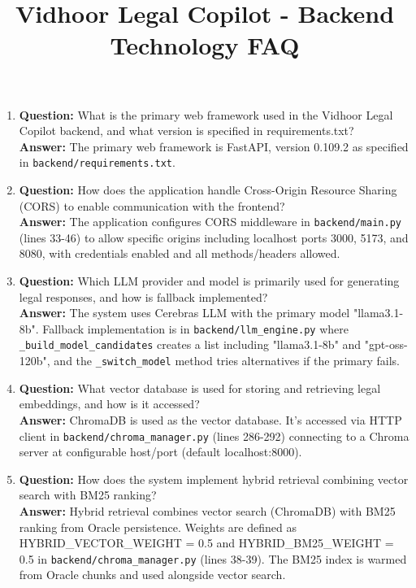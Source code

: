 \documentclass[11pt]{article}
\title{Vidhoor Legal Copilot - Backend Technology FAQ}
\author{}
\date{}
\begin{document}
\maketitle

\begin{enumerate}
\item \textbf{Question:} What is the primary web framework used in the Vidhoor Legal Copilot backend, and what version is specified in requirements.txt?
\\ \textbf{Answer:} The primary web framework is FastAPI, version 0.109.2 as specified in \texttt{backend/requirements.txt}.

\item \textbf{Question:} How does the application handle Cross-Origin Resource Sharing (CORS) to enable communication with the frontend?
\\ \textbf{Answer:} The application configures CORS middleware in \texttt{backend/main.py} (lines 33-46) to allow specific origins including localhost ports 3000, 5173, and 8080, with credentials enabled and all methods/headers allowed.

\item \textbf{Question:} Which LLM provider and model is primarily used for generating legal responses, and how is fallback implemented?
\\ \textbf{Answer:} The system uses Cerebras LLM with the primary model "llama3.1-8b". Fallback implementation is in \texttt{backend/llm\_engine.py} where \texttt{\_build\_model\_candidates} creates a list including "llama3.1-8b" and "gpt-oss-120b", and the \texttt{\_switch\_model} method tries alternatives if the primary fails.

\item \textbf{Question:} What vector database is used for storing and retrieving legal embeddings, and how is it accessed?
\\ \textbf{Answer:} ChromaDB is used as the vector database. It's accessed via HTTP client in \texttt{backend/chroma\_manager.py} (lines 286-292) connecting to a Chroma server at configurable host/port (default localhost:8000).

\item \textbf{Question:} How does the system implement hybrid retrieval combining vector search with BM25 ranking?
\\ \textbf{Answer:} Hybrid retrieval combines vector search (ChromaDB) with BM25 ranking from Oracle persistence. Weights are defined as HYBRID\_VECTOR\_WEIGHT = 0.5 and HYBRID\_BM25\_WEIGHT = 0.5 in \texttt{backend/chroma\_manager.py} (lines 38-39). The BM25 index is warmed from Oracle chunks and used alongside vector search.


\end{enumerate}
\end{document}
